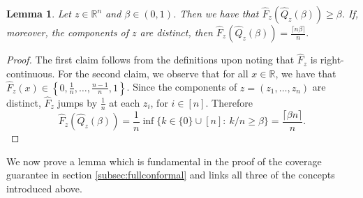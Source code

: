 \documentclass[11pt, titlepage]{article} %
\numberwithin{equation}{section}
\newtheorem{lemma}{Lemma}
\theoremstyle{definition}
\numberwithin{theorem}{section}
\numberwithin{lemma}{section}
\numberwithin{corollary}{section}
\numberwithin{proposition}{section}
\numberwithin{definition}{section}
\numberwithin{remark}{section}
\begin{document}
\begin{lemma}
    Let \(z \in \mathbb{R}^n\) and \(\beta \in (0,1)\). Then we have that \(\hat{F}_z\left(\hat{Q}_z(\beta)\right) \geq \beta\). If, moreover, the components of \(z\) are distinct, then \(\hat{F}_z\left(\hat{Q}_z(\beta)\right) = \frac{\lceil{n\beta}\rceil}{n}.\)
\label{lemma:cdfquantile}
\end{lemma}
\begin{proof}
    The first claim follows from the definitions upon noting that \(\hat{F}_z\) is right-continuous. For the second claim, we observe that for all \(x \in \mathbb{R}\), we have that \(\hat{F}_z(x) \in \left\{0, \frac{1}{n}, \ldots, \frac{n-1}{n}, 1\right\}\). Since the components of \(z = (z_1, \ldots, z_n)\) are distinct, \(\hat{F}_z\) jumps by \(\frac{1}{n}\) at each \(z_i\), for \(i \in [n]\). Therefore \[\hat{F}_z\left(\hat{Q}_z(\beta)\right) = \frac{1}{n} \inf \{k \in \{0\} \cup [n]: \ k/n \geq \beta \} = \frac{\lceil{\beta n}\rceil}{n}.\]
\end{proof}

\noindent
We now prove a lemma which is fundamental in the proof of the coverage guarantee in section \cref{subsec:fullconformal} and links all three of the concepts introduced above.
\end{document}
